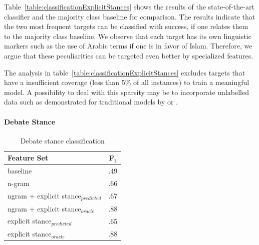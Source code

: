 \documentclass[11pt]{article}
\begin{document}
Table~\ref{table:classificationExplicitStances} shows the results of the state-of-the-art classifier and the majority class baseline for comparison.
The results indicate that the two most frequent targets can be classified with success, if one relates them to the majority class baseline.
We observe that each target has its own linguistic markers such as the use of Arabic terms if one is in favor of Islam. 
Therefore, we argue that these peculiarities can be targeted even better by specialized features.

The analysis in table~\ref{table:classificationExplicitStances} excludes targets that have a insufficient coverage (less than 5\% of all instances) to train a meaningful model.
A possibility to deal with this sparsity may be to incorporate unlabelled data such as demonstrated for traditional models by  or .

\paragraph{Debate Stance}

\begin{table}[]
\small
\centering
\begin{tabular}{lc}
\toprule
Feature Set    & F$_1$ \\
\midrule
baseline       & .49            \\[5pt]
n-gram          & .66             \\
ngram + explicit stance$_{predicted}$ & .67            \\
ngram + explicit stance$_{oracle}$ &  .88      \\
explicit stance$_{predicted}$ & .65  \\
explicit stance$_{oracle}$ & .88  \\
\bottomrule         
\end{tabular}
\caption{Debate stance classification}
\label{table:classificationDebateStances}
\end{table}
\end{document}
